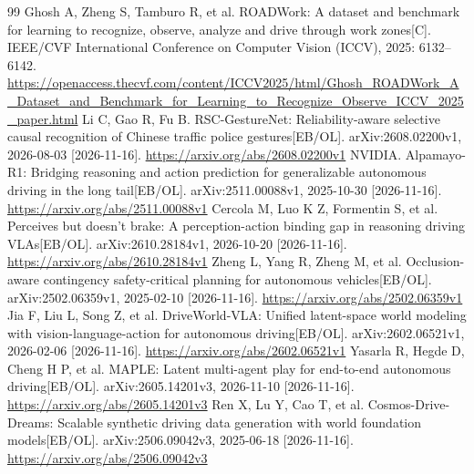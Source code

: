 \documentclass[UTF8,zihao=-4,fontset=windows]{ctexart}
\begin{document}
\FloatBarrier\clearpage
{}
{}
\begin{thebibliography}{99}\small
\setlength{\itemsep}{3pt}\setlength{\parsep}{0pt}\setlength{\parskip}{0pt}
 Ghosh A, Zheng S, Tamburo R, et al. ROADWork: A dataset and benchmark for learning to recognize, observe, analyze and drive through work zones[C]. IEEE/CVF International Conference on Computer Vision (ICCV), 2025: 6132--6142. \url{https://openaccess.thecvf.com/content/ICCV2025/html/Ghosh_ROADWork_A_Dataset_and_Benchmark_for_Learning_to_Recognize_Observe_ICCV_2025_paper.html}
 Li C, Gao R, Fu B. RSC-GestureNet: Reliability-aware selective causal recognition of Chinese traffic police gestures[EB/OL]. arXiv:2608.02200v1, 2026-08-03 [2026-11-16]. \url{https://arxiv.org/abs/2608.02200v1}
 NVIDIA. Alpamayo-R1: Bridging reasoning and action prediction for generalizable autonomous driving in the long tail[EB/OL]. arXiv:2511.00088v1, 2025-10-30 [2026-11-16]. \url{https://arxiv.org/abs/2511.00088v1}
 Cercola M, Luo K Z, Formentin S, et al. Perceives but doesn't brake: A perception-action binding gap in reasoning driving VLAs[EB/OL]. arXiv:2610.28184v1, 2026-10-20 [2026-11-16]. \url{https://arxiv.org/abs/2610.28184v1}
 Zheng L, Yang R, Zheng M, et al. Occlusion-aware contingency safety-critical planning for autonomous vehicles[EB/OL]. arXiv:2502.06359v1, 2025-02-10 [2026-11-16]. \url{https://arxiv.org/abs/2502.06359v1}
 Jia F, Liu L, Song Z, et al. DriveWorld-VLA: Unified latent-space world modeling with vision-language-action for autonomous driving[EB/OL]. arXiv:2602.06521v1, 2026-02-06 [2026-11-16]. \url{https://arxiv.org/abs/2602.06521v1}
 Yasarla R, Hegde D, Cheng H P, et al. MAPLE: Latent multi-agent play for end-to-end autonomous driving[EB/OL]. arXiv:2605.14201v3, 2026-11-10 [2026-11-16]. \url{https://arxiv.org/abs/2605.14201v3}
 Ren X, Lu Y, Cao T, et al. Cosmos-Drive-Dreams: Scalable synthetic driving data generation with world foundation models[EB/OL]. arXiv:2506.09042v3, 2025-06-18 [2026-11-16]. \url{https://arxiv.org/abs/2506.09042v3}
\end{thebibliography}
\end{document}

